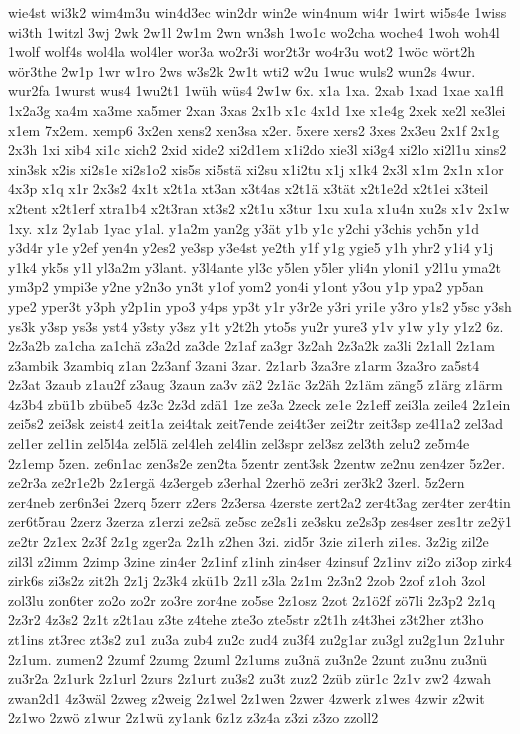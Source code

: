 {wie4st
wi3k2
wim4m3u
win4d3ec
win2dr
win2e
win4num
wi4r
1wirt
wi5s4e
1wiss
wi3th
1witzl
3wj
2wk
2w1l
2w1m
2wn
wn3sh
1wo1c
wo2cha
woche4
1woh
woh4l
1wolf
wolf4s
wol4la
wol4ler
wor3a
wo2r3i
wor2t3r
wo4r3u
wot2
1wöc
wört2h
wör3the
2w1p
1wr
w1ro
2ws
w3s2k
2w1t
wti2
w2u
1wuc
wuls2
wun2s
4wur.
wur2fa
1wurst
wus4
1wu2t1
1wüh
wüs4
2w1w
6x.
x1a
1xa.
2xab
1xad
1xae
xa1fl
1x2a3g
xa4m
xa3me
xa5mer
2xan
3xas
2x1b
x1c
4x1d
1xe
x1e4g
2xek
xe2l
xe3lei
x1em
7x2em.
xemp6
3x2en
xens2
xen3sa
x2er.
5xere
xers2
3xes
2x3eu
2x1f
2x1g
2x3h
1xi
xib4
xi1c
xich2
2xid
xide2
xi2d1em
x1i2do
xie3l
xi3g4
xi2lo
xi2l1u
xins2
xin3sk
x2is
xi2s1e
xi2s1o2
xis5s
xi5stä
xi2su
x1i2tu
x1j
x1k4
2x3l
x1m
2x1n
x1or
4x3p
x1q
x1r
2x3s2
4x1t
x2t1a
xt3an
x3t4as
x2t1ä
x3tät
x2t1e2d
x2t1ei
x3teil
x2tent
x2t1erf
xtra1b4
x2t3ran
xt3s2
x2t1u
x3tur
1xu
xu1a
x1u4n
xu2s
x1v
2x1w
1xy.
x1z
2y1ab
1yac
y1al.
y1a2m
yan2g
y3ät
y1b
y1c
y2chi
y3chis
ych5n
y1d
y3d4r
y1e
y2ef
yen4n
y2es2
ye3sp
y3e4st
ye2th
y1f
y1g
ygie5
y1h
yhr2
y1i4
y1j
y1k4
yk5s
y1l
yl3a2m
y3lant.
y3l4ante
yl3c
y5len
y5ler
yli4n
yloni1
y2l1u
yma2t
ym3p2
ympi3e
y2ne
y2n3o
yn3t
y1of
yom2
yon4i
y1ont
y3ou
y1p
ypa2
yp5an
ype2
yper3t
y3ph
y2p1in
ypo3
y4ps
yp3t
y1r
y3r2e
y3ri
yri1e
y3ro
y1s2
y5sc
y3sh
ys3k
y3sp
ys3s
yst4
y3sty
y3sz
y1t
y2t2h
yto5s
yu2r
yure3
y1v
y1w
y1y
y1z2
6z.
2z3a2b
za1cha
za1chä
z3a2d
za3de
2z1af
za3gr
3z2ah
2z3a2k
za3li
2z1all
2z1am
z3ambik
3zambiq
z1an
2z3anf
3zani
3zar.
2z1arb
3za3re
z1arm
3za3ro
za5st4
2z3at
3zaub
z1au2f
z3aug
3zaun
za3v
zä2
2z1äc
3z2äh
2z1äm
zäng5
z1ärg
z1ärm
4z3b4
zbü1b
zbübe5
4z3c
2z3d
zdä1
1ze
ze3a
2zeck
ze1e
2z1eff
zei3la
zeile4
2z1ein
zei5s2
zei3sk
zeist4
zeit1a
zei4tak
zeit7ende
zei4t3er
zei2tr
zeit3sp
ze4l1a2
zel3ad
zel1er
zel1in
zel5l4a
zel5lä
zel4leh
zel4lin
zel3spr
zel3sz
zel3th
zelu2
ze5m4e
2z1emp
5zen.
ze6n1ac
zen3s2e
zen2ta
5zentr
zent3sk
2zentw
ze2nu
zen4zer
5z2er.
ze2r3a
ze2r1e2b
2z1ergä
4z3ergeb
z3erhal
2zerhö
ze3ri
zer3k2
3zerl.
5z2ern
zer4neb
zer6n3ei
2zerq
5zerr
z2ers
2z3ersa
4zerste
zert2a2
zer4t3ag
zer4ter
zer4tin
zer6t5rau
2zerz
3zerza
z1erzi
ze2sä
ze5sc
ze2s1i
ze3sku
ze2s3p
zes4ser
zes1tr
ze2^^ff1
ze2tr
2z1ex
2z3f
2z1g
zger2a
2z1h
z2hen
3zi.
zid5r
3zie
zi1erh
zi1es.
3z2ig
zil2e
zil3l
z2imm
2zimp
3zine
zin4er
2z1inf
z1inh
zin4ser
4zinsuf
2z1inv
zi2o
zi3op
zirk4
zirk6s
zi3s2z
zit2h
2z1j
2z3k4
zkü1b
2z1l
z3la
2z1m
2z3n2
2zob
2zof
z1oh
3zol
zol3lu
zon6ter
zo2o
zo2r
zo3re
zor4ne
zo5se
2z1osz
2zot
2z1ö2f
zö7li
2z3p2
2z1q
2z3r2
4z3s2
2z1t
z2t1au
z3te
z4tehe
zte3o
zte5str
z2t1h
z4t3hei
z3t2her
zt3ho
zt1ins
zt3rec
zt3s2
zu1
zu3a
zub4
zu2c
zud4
zu3f4
zu2g1ar
zu3gl
zu2g1un
2z1uhr
2z1um.
zumen2
2zumf
2zumg
2zuml
2z1ums
zu3nä
zu3n2e
2zunt
zu3nu
zu3nü
zu3r2a
2z1urk
2z1url
2zurs
2z1urt
zu3s2
zu3t
zuz2
2züb
zür1c
2z1v
zw2
4zwah
zwan2d1
4z3wäl
2zweg
z2weig
2z1wel
2z1wen
2zwer
4zwerk
z1wes
4zwir
z2wit
2z1wo
2zwö
z1wur
2z1wü
zy1ank
6z1z
z3z4a
z3zi
z3zo
zzoll2
}

